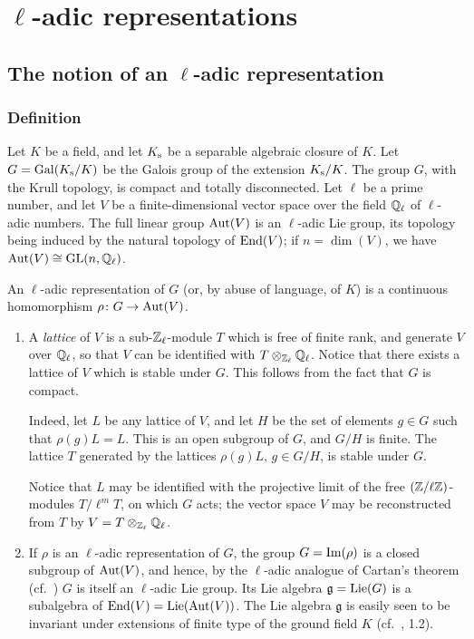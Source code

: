 \chapter{\texorpdfstring{$\ell$}{ℓ}-adic representations}%
\label{ch:i}

\section{The notion of an \texorpdfstring{$\ell$}{ℓ}-adic representation}
\label{sec:I_1}

\subsection{Definition}\label{sec:I_11}
Let $K$ be a field,
\dpage
and let $K_{\mathrm{s}}$ be a separable algebraic closure of $K$.  Let $G =
\operatorname{Gal}(K_{\mathrm{s}} / K)$ be the Galois group of the extension $K_{\mathrm{s}}/K$.
The group $G$, with the Krull topology, is compact and totally disconnected.
Let $\ell$ be a prime number, and let $V$ be a finite-dimensional vector space
over the field $\mathbb{Q}_\ell$ of $\ell$-adic numbers.  The full linear group
$\operatorname{Aut}(V)$ is an $\ell$-adic Lie group, its topology being induced by the
natural topology of $\operatorname{End}(V)$; if $n = \dim(V)$, we have $\operatorname{Aut}(V) \cong \operatorname{GL}(n,
\mathbb{Q}_\ell)$.

\begin{mydef}
An $\ell$-adic representation of $G$ (or, by abuse of language, of $K$) is a
continuous homomorphism $\rho \colon G \to \operatorname{Aut}(V)$.
\end{mydef}

\begin{obs}
\begin{enumerate}
\item\label{rmk:I_11_1}
	A \emph{lattice} of $V$ is a sub-$\mathbb{Z}_\ell$-module $T$ which is free of
	finite rank, and generate $V$ over $\mathbb{Q}_\ell$, so that $V$ can be
	identified with $T \otimes_{\mathbb{Z}_\ell} \mathbb{Q}_\ell$.  Notice that there
	exists a lattice of $V$ which is stable under $G$. This follows from
	the fact that $G$ is compact.

	Indeed,
	\dpage
	let $L$ be any lattice of $V$, and let $H$ be the set of
	elements $g \in G$ such that $\rho(g)L = L$. This is an open
	subgroup of $G$, and $G/H$ is finite. The lattice $T$
	generated by the lattices $\rho(g)L$, $g \in G/H$, is stable
	under $G$.

	Notice that $L$ may be identified with the projective limit of
	the free $(\mathbb{Z}/\ell\mathbb{Z})$-modules $T/\ell^m T$, on which $G$
	acts; the vector space $V$ may be reconstructed from $T$ by $V
	= T \otimes_{\mathbb{Z}_\ell} \mathbb{Q}_\ell$.

\item If $\rho$ is an $\ell$-adic representation of $G$, the group $G
	= \operatorname{Im}(\rho)$ is a closed subgroup of $\operatorname{Aut}(V)$, and hence, by
	the $\ell$-adic analogue of Cartan's theorem (cf.\ 
	\cite[5-42]{28}) $G$ is itself an $\ell$-adic Lie group.
	Its Lie algebra $\mathfrak{g} = \operatorname{Lie}(G)$ is a subalgebra of
	$\operatorname{End}(V) = \operatorname{Lie}(\operatorname{Aut}(V))$. The Lie algebra $\mathfrak{g}$ is
	easily seen to be invariant under extensions of finite type of
	the ground field $K$ (cf.\ \cite{24}, 1.2).
\end{enumerate}
\end{obs}


